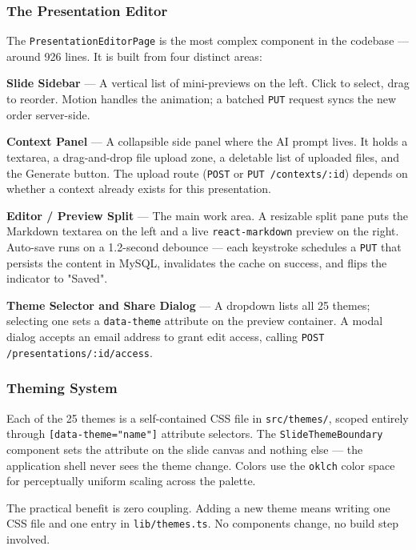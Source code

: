 \documentclass[10pt,a4paper]{article}
\begin{document}
\subsubsection{The Presentation Editor}

The \texttt{Presentation}\allowbreak\texttt{EditorPage} is the most complex component in the codebase --- around 926 lines. It is built from four distinct areas:

\textbf{Slide Sidebar} --- A vertical list of mini-previews on the left. Click to select, drag to reorder. Motion handles the animation; a batched \texttt{PUT} request syncs the new order server-side.

\textbf{Context Panel} --- A collapsible side panel where the AI prompt lives. It holds a textarea, a drag-and-drop file upload zone, a deletable list of uploaded files, and the Generate button. The upload route (\texttt{POST} or \texttt{PUT /contexts/:id}) depends on whether a context already exists for this presentation.

\textbf{Editor / Preview Split} --- The main work area. A resizable split pane puts the Markdown textarea on the left and a live \texttt{react-markdown} preview on the right. Auto-save runs on a 1.2-second debounce --- each keystroke schedules a \texttt{PUT} that persists the content in MySQL, invalidates the cache on success, and flips the indicator to "Saved".

\textbf{Theme Selector and Share Dialog} --- A dropdown lists all 25 themes; selecting one sets a \texttt{data-theme} attribute on the preview container. A modal dialog accepts an email address to grant edit access, calling \texttt{POST /presentations/:id/access}.

\subsubsection{Theming System}

Each of the 25 themes is a self-contained CSS file in \texttt{src/themes/}, scoped entirely through \texttt{[data-theme=}\allowbreak\texttt{"name"]} attribute selectors. The \texttt{Slide}\allowbreak\texttt{ThemeBoundary} component sets the attribute on the slide canvas and nothing else --- the application shell never sees the theme change. Colors use the \texttt{oklch} color space for perceptually uniform scaling across the palette.

The practical benefit is zero coupling. Adding a new theme means writing one CSS file and one entry in \texttt{lib/themes.ts}. No components change, no build step involved.
\end{document}
